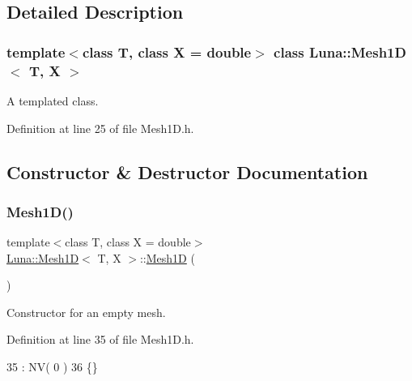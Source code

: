 \subsection{Detailed Description}
\subsubsection*{template$<$class T, class X = double$>$\newline
class Luna\+::\+Mesh1\+D$<$ T, X $>$}

A templated class. 

Definition at line 25 of file Mesh1\+D.\+h.



\subsection{Constructor \& Destructor Documentation}
\mbox{\label{classLuna_1_1Mesh1D_a84574dba756de3111663ffadd973b91d}} 
\subsubsection{\texorpdfstring{Mesh1\+D()}{Mesh1D()}\hspace{0.1cm}{\footnotesize\ttfamily [1/2]}}
{\footnotesize\ttfamily template$<$class T, class X = double$>$ \\
\hyperlink{classLuna_1_1Mesh1D}{Luna\+::\+Mesh1D}$<$ T, X $>$\+::\hyperlink{classLuna_1_1Mesh1D}{Mesh1D} (\begin{DoxyParamCaption}{ }\end{DoxyParamCaption})\hspace{0.3cm}{\ttfamily [inline]}}



Constructor for an empty mesh. 



Definition at line 35 of file Mesh1\+D.\+h.


\begin{DoxyCode}
35              : NV( 0 )
36     \{\}
\end{DoxyCode}
\mbox{\label{classLuna_1_1Mesh1D_a9ef6bded127b6f27218f80b763564f46}} 
